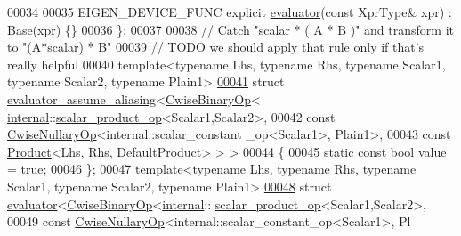 \begin{DoxyCode}
00034   
00035   EIGEN\_DEVICE\_FUNC \textcolor{keyword}{explicit} \hyperlink{struct_eigen_1_1internal_1_1evaluator}{evaluator}(\textcolor{keyword}{const} XprType& xpr) : Base(xpr) \{\}
00036 \};
00037  
00038 \textcolor{comment}{// Catch "scalar * ( A * B )" and transform it to "(A*scalar) * B"}
00039 \textcolor{comment}{// TODO we should apply that rule only if that's really helpful}
00040 \textcolor{keyword}{template}<\textcolor{keyword}{typename} Lhs, \textcolor{keyword}{typename} Rhs, \textcolor{keyword}{typename} Scalar1, \textcolor{keyword}{typename} Scalar2, \textcolor{keyword}{typename} Plain1>
\hyperlink{struct_eigen_1_1internal_1_1evaluator__assume__aliasing_3_01_cwise_binary_op_3_01internal_1_1scae866e2c7242096d7b5fd789e3b867e0a}{00041} \textcolor{keyword}{struct }\hyperlink{struct_eigen_1_1internal_1_1evaluator__assume__aliasing}{evaluator\_assume\_aliasing}<\hyperlink{group___core___module_class_eigen_1_1_cwise_binary_op}{CwiseBinaryOp}<
      \hyperlink{namespaceinternal}{internal}::\hyperlink{struct_eigen_1_1internal_1_1scalar__product__op}{scalar\_product\_op}<Scalar1,Scalar2>,
00042                                                const \hyperlink{group___core___module_class_eigen_1_1_cwise_nullary_op}{CwiseNullaryOp}<internal::scalar\_constant
      \_op<Scalar1>, Plain1>,
00043                                                const \hyperlink{group___core___module_class_eigen_1_1_product}{Product}<Lhs, Rhs, DefaultProduct> > >
00044 \{
00045   \textcolor{keyword}{static} \textcolor{keyword}{const} \textcolor{keywordtype}{bool} value = \textcolor{keyword}{true};
00046 \};
00047 \textcolor{keyword}{template}<\textcolor{keyword}{typename} Lhs, \textcolor{keyword}{typename} Rhs, \textcolor{keyword}{typename} Scalar1, \textcolor{keyword}{typename} Scalar2, \textcolor{keyword}{typename} Plain1>
\hyperlink{struct_eigen_1_1internal_1_1evaluator_3_01_cwise_binary_op_3_01internal_1_1scalar__product__op_321f22566d2663743c7f9d1c3e4e03f69}{00048} \textcolor{keyword}{struct }\hyperlink{struct_eigen_1_1internal_1_1evaluator}{evaluator}<\hyperlink{group___core___module_class_eigen_1_1_cwise_binary_op}{CwiseBinaryOp}<\hyperlink{namespaceinternal}{internal}::
      \hyperlink{struct_eigen_1_1internal_1_1scalar__product__op}{scalar\_product\_op}<Scalar1,Scalar2>,
00049                                const \hyperlink{group___core___module_class_eigen_1_1_cwise_nullary_op}{CwiseNullaryOp}<internal::scalar\_constant\_op<Scalar1>, Pl

\end{DoxyCode}
